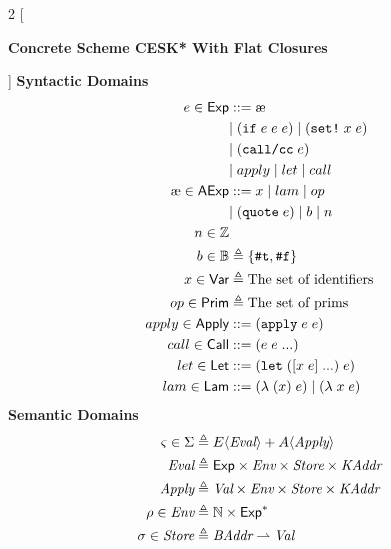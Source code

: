 \documentclass[12pt,draft]{article}
\newcommand\mae{\ensuremath{\text{\ae}}}
\newcommand{\letsyn}[3]{(\texttt{let}\;([#1\;#2]\;...)\;#3)}
\newcommand{\ifsyn}[3]{(\texttt{if}\;#1\;#2\;#3)}
\newcommand{\applysyn}[2]{(\texttt{apply}\;#1\;#2)}
\newcommand{\callccsyn}[1]{(\texttt{call/cc}\;#1)}
\newcommand{\setsyn}[2]{(\texttt{set!}\;#1\;#2)}
\newcommand{\quotesyn}[1]{(\texttt{quote}\;#1)}
\newcommand{\truesyn}{\texttt{\#t}}
\newcommand{\falsesyn}{\texttt{\#f}}
\begin{document}
\begin{multicols*}{2}
  [
  \begin{center}
    \textbf{Concrete Scheme CESK* With Flat Closures} \\
  \end{center}
  ]
  \noindent
  \textbf{Syntactic Domains}
  \begin{align*}
    e \in \cExp &::= \mae \\
                & |\; \ifsyn{e}{e}{e} \;|\; \setsyn{x}{e} \\
                &|\; \callccsyn{e} \\
                &|\; apply \;|\; let \;|\; call \\
    \mae \in \textsf{AExp} &::= x \;|\; lam \;|\; op \\
                &|\; \quotesyn{e} \;|\; b \;|\; n \\
    n \in \mathbb{Z} &\\
    b \in \mathbb{B} &\triangleq \{\truesyn , \falsesyn\} \\
    x \in \cVar &\triangleq \text{The set of identifiers} \\
    op \in \cPrim &\triangleq \text{The set of prims} \\
    apply \in \cApply &::= \applysyn{e}{e} \\
    call \in \cCall &::= (e \; e \; ...) \\
    let \in \cLet &::= \letsyn{x}{e}{e} \\
    lam \in \cLam &::= (\lambda \; (x) \; e) \;|\; (\lambda \; x \; e)
  \end{align*}
  \vfill\null
  \columnbreak
  \noindent
  \textbf{Semantic Domains}
  \begin{align*}
    \cstate \in \cState &\triangleq E\langle \textit{Eval} \rangle
                          + A\langle \textit{Apply} \rangle \\
    \textit{Eval} &\triangleq \cExp \times \cEnv \times \cStore \times \cKAddr \\
    \textit{Apply} &\triangleq \cVal \times \cEnv \times \cStore \times \cKAddr \\
    \cenv \in \cEnv &\triangleq \mathbb{N} \times \cExp^* \\
    \cstore \in \cStore &\triangleq \cBAddr
                          \rightharpoonup \cVal \\

\end{align*}
\end{multicols*}
\end{document}
